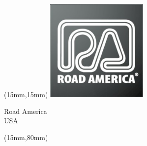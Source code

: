 \begin{textblock*}{50mm}(15mm,15mm)%
\includegraphics[width=50mm]{LG/2015-05-20_00092.png}
\par Road America\\ USA
\end{textblock*}
\begin{textblock*}{185mm}(15mm,80mm)%
\end{textblock*}

